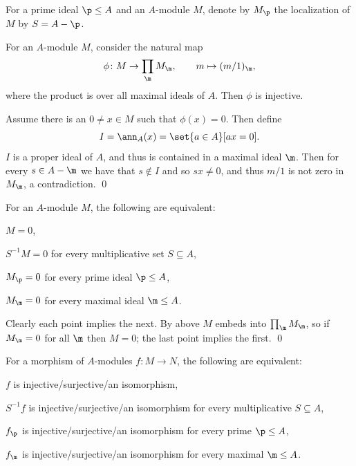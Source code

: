     For a prime ideal $\p\leq A$ and an $A$-module $M$, denote by $M_\p$ the localization of $M$ by $S=A-\p$.

\edefn

\blemm

    For an $A$-module $M$, consider the natural map
    $$ \phi\colon M\to\prod_\m M_\m,\qquad m\mapsto (m/1)_\m , $$
    where the product is over all maximal ideals of $A$.
    Then $\phi$ is injective.

\elemm

\bproof

    Assume there is an $0\neq x\in M$ such that $\phi(x)=0$.
    Then define
    $$ I = \ann_A(x) = \set{a\in A}[ax=0] . $$
    $I$ is a proper ideal of $A$, and thus is contained in a maximal ideal $\m$.
    Then for every $s\in A-\m$ we have that $s\notin I$ and so $sx\neq0$, and thus $m/1$ is not zero in $M_\m$, a contradiction.
    \qed

\eproof

\bcoro

    For an $A$-module $M$, the following are equivalent:
    \benum
        \item $M=0$,
        \item $S^{-1}M=0$ for every multiplicative set $S\subseteq A$,
        \item $M_\p=0$ for every prime ideal $\p\leq A$,
        \item $M_\m=0$ for every maximal ideal $\m\leq A$.
    \eenum

\ecoro

\bproof

    Clearly each point implies the next.
    By above $M$ embeds into $\prod_\m M_\m$, so if $M_\m=0$ for all $\m$ then $M=0$; the last point implies the first.
    \qed

\eproof

\bcoro

    For a morphism of $A$-modules $f\colon M\to N$, the following are equivalent:
    \benum
        \item $f$ is injective/surjective/an isomorphism,
        \item $S^{-1}f$ is injective/surjective/an isomorphism for every multiplicative $S\subseteq A$,
        \item $f_\p$ is injective/surjective/an isomorphism for every prime $\p\leq A$,
        \item $f_\m$ is injective/surjective/an isomorphism for every maximal $\m\leq A$.
    \eenum

